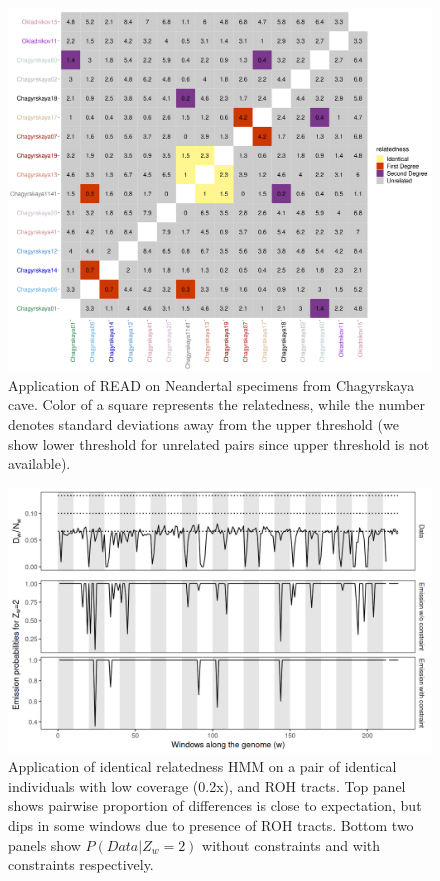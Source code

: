 \documentclass[12pt, letterpaper]{article}
\begin{document}
\begin{figure}[h!]
    \includegraphics[width=18cm]{supplementary_info/plots/fil0_read_plot.png}
    \centering
    \caption{Application of READ on Neandertal specimens from Chagyrskaya cave. Color of a square represents the relatedness, while the number denotes standard deviations away from the upper threshold (we show lower threshold for unrelated pairs since upper threshold is not available).}
    \label{figS2:Chagyrskaya_READ}
\end{figure}


\begin{figure}[h!]
    \includegraphics[width=18cm]{supplementary_info/plots/contam0_inbred1_run57_coverage0.2_asc0_inputMode_hapProbs_fil0_pair0_15_relid_emissions_bnds.png}
    \centering
    \caption{Application of identical relatedness HMM on a pair of identical individuals with low coverage (0.2x), and ROH tracts. Top panel shows pairwise proportion of differences is close to expectation, but dips in some windows due to presence of ROH tracts. Bottom two panels show $P(Data|Z_w=2)$ without constraints and with constraints respectively.}
    \label{figS3:bnds}
\end{figure}
\end{document}

